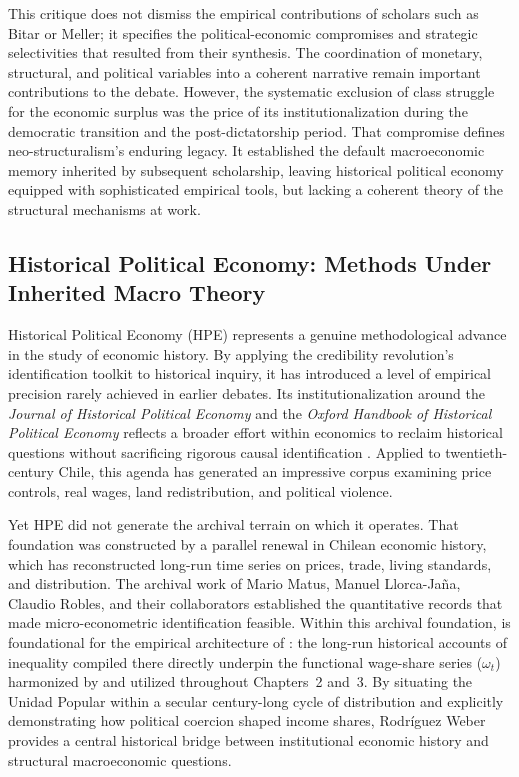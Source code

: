 This critique does not dismiss the empirical contributions of scholars such as Bitar or 
Meller; it specifies the political-economic compromises and strategic selectivities that resulted from their synthesis. The coordination of monetary, structural, and political variables into a coherent narrative remain important contributions to the debate. However, the systematic exclusion of class struggle for the economic surplus was the price of its institutionalization during the democratic transition and the post-dictatorship period. That compromise defines neo-structuralism's enduring legacy. It established the default macroeconomic memory inherited by subsequent scholarship, leaving historical political economy equipped with sophisticated empirical tools, but lacking a coherent theory of the structural mechanisms at work.

\subsection{Historical Political Economy: Methods Under Inherited Macro Theory}
\label{sec:A4_historical_PE}

Historical Political Economy (HPE) represents a genuine methodological advance in the study 
of economic history. By applying the credibility revolution's identification toolkit to historical inquiry, 
it has introduced a level of empirical precision rarely achieved in earlier debates. Its institutionalization 
around the \textit{Journal of Historical Political Economy} and the \textit{Oxford Handbook of Historical 
	Political Economy} reflects a broader effort within economics to reclaim historical questions without sacrificing 
rigorous causal identification \citep{Gailmard2021,JenkinsRubin2024,CharnyshFinkelGehlbach2023}. Applied to twentieth-century 
Chile, this agenda has generated an impressive corpus examining price controls, real wages, land redistribution, 
and political violence.

Yet HPE did not generate the archival terrain on which it operates. That foundation was 
constructed by a parallel renewal in Chilean economic history, which has reconstructed long-run time series 
on prices, trade, living standards, and distribution. The archival work of Mario Matus, Manuel Llorca-Jaña, 
Claudio Robles, and their collaborators established the quantitative records that made micro-econometric 
identification feasible. Within this archival foundation, \citet{RodriguezWeber2018} is foundational for the 
empirical architecture of \citet{Polanco2026}: the long-run historical accounts of inequality compiled there 
directly underpin the functional wage-share series ($\omega_t$) harmonized by \citet{Astorga2023} and utilized 
throughout Chapters~2 and~3. By situating the Unidad Popular within a secular century-long cycle of distribution 
and explicitly demonstrating how political coercion shaped income shares, Rodríguez Weber provides a central 
historical bridge between institutional economic history and structural macroeconomic questions.

